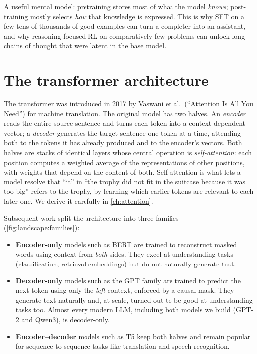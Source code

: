 \begin{keyidea}
A useful mental model: pretraining stores most of what the model \emph{knows}; post-training mostly
selects \emph{how} that knowledge is expressed. This is why SFT on a few tens of thousands of good
examples can turn a completer into an assistant, and why reasoning-focused RL on comparatively few
problems can unlock long chains of thought that were latent in the base model.
\end{keyidea}

\section{The transformer architecture}\label{sec:landscape:transformer}

The transformer was introduced in 2017 by Vaswani et al.\ (``Attention Is All You Need'') for machine translation. The original model has two halves. An
\emph{encoder} reads the entire source sentence and turns each token into a context-dependent vector;
a \emph{decoder} generates the target sentence one token at a time, attending both to the tokens it has
already produced and to the encoder's vectors. Both halves are stacks of identical layers whose central
operation is \emph{self-attention}: each position computes a weighted average of the representations of
other positions, with weights that depend on the content of both. Self-attention is what lets a model
resolve that ``it'' in ``the trophy did not fit in the suitcase because it was too big'' refers to the
trophy, by learning which earlier tokens are relevant to each later one. We derive it carefully in
\cref{ch:attention}.

Subsequent work split the architecture into three families (\cref{fig:landscape:families}):
\begin{itemize}
\item \textbf{Encoder-only} models such as BERT are trained to reconstruct masked words using context
  from \emph{both} sides. They excel at understanding tasks (classification, retrieval embeddings) but do
  not naturally generate text.
\item \textbf{Decoder-only} models such as the GPT family are trained to predict the next token using
  only the \emph{left} context, enforced by a causal mask. They generate text naturally and, at scale,
  turned out to be good at understanding tasks too. Almost every modern LLM, including both models we
  build (GPT-2 and Qwen3), is decoder-only.
\item \textbf{Encoder--decoder} models such as T5 keep both halves and remain popular for
  sequence-to-sequence tasks like translation and speech recognition.
\end{itemize}

